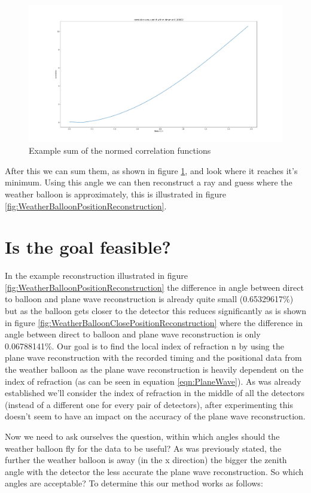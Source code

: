 \documentclass[11pt,a4paper,faculty=we,language=en,doctype=report]{cls/ugent-doc}
\begin{document}
\begin{figure}
	\centering
	\includegraphics[width=\textwidth]{SummedCorrelation.pdf}
	\caption{Example sum of the normed correlation functions}
	\label{fig:SummedCorrelation}
\end{figure}
After this we can sum them, as shown in figure \ref{fig:SummedCorrelation}, and look
where it reaches it's minimum. Using this angle we can then reconstruct a ray and guess 
where the weather balloon is approximately, this is illustrated in figure 
\ref{fig:WeatherBalloonPositionReconstruction}. 
\section{Is the goal feasible?}
In the example reconstruction illustrated in figure
\ref{fig:WeatherBalloonPositionReconstruction} the difference in angle between
direct to balloon and plane wave reconstruction is already quite small
(0.65329617\%) but as the balloon gets closer to the detector this reduces
significantly as is shown in figure
\ref{fig:WeatherBalloonClosePositionReconstruction} where the difference in
angle between direct to balloon and plane wave reconstruction is only
0.06788141\%. Our goal is to find the local index of refraction n by using the
plane wave reconstruction with the recorded timing and the positional data from
the weather balloon as the plane wave reconstruction is heavily dependent on
the index of refraction (as can be seen in equation \ref{eqn:PlaneWave}). As
was already established we'll consider the index of refraction in the middle of
all the detectors (instead of a different one for every pair of detectors),
after experimenting this doesn't seem to have an impact on the accuracy of the
plane wave reconstruction. 

Now we need to ask ourselves the question, within which angles should the
weather balloon fly for the data to be useful?  As was previously stated, the
further the weather balloon is away (in the x direction) the bigger the zenith
angle with the detector the less accurate the plane wave reconstruction.  So
which angles are acceptable? To determine this our method works as follows: 
\end{document}
